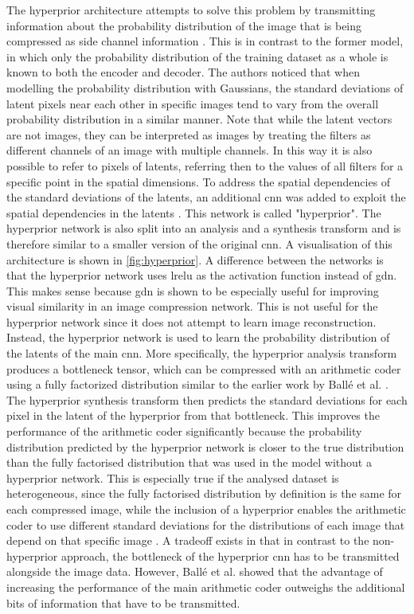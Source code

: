 The hyperprior architecture attempts to solve this problem by transmitting information about the probability distribution of the image that is being compressed as side channel information \citep{balle_variational_2018}. This is in contrast to the former model, in which only the probability distribution of the training dataset as a whole is known to both the encoder and decoder. The authors noticed that when modelling the probability distribution with Gaussians, the standard deviations of latent pixels near each other in specific images tend to vary from the overall probability distribution in a similar manner. Note that while the latent vectors are not images, they can be interpreted as images by treating the filters as different channels of an image with multiple channels. In this way it is also possible to refer to pixels of latents, referring then to the values of all filters for a specific point in the spatial dimensions. To address the spatial dependencies of the standard deviations of the latents, an additional \ac{cnn} was added to exploit the spatial dependencies in the latents \citep{balle_variational_2018}. This network is called "hyperprior". The hyperprior network is also split into an analysis and a synthesis transform and is therefore similar to a smaller version of the original \ac{cnn}. A visualisation of this architecture is shown in \autoref{fig:hyperprior}. A difference between the networks is that the hyperprior network uses \ac{lrelu} as the activation function instead of \ac{gdn}. This makes sense because \ac{gdn} is shown to be especially useful for improving visual similarity in an image compression network. This is not useful for the hyperprior network since it does not attempt to learn image reconstruction. Instead, the hyperprior network is used to learn the probability distribution of the latents of the main \ac{cnn}. More specifically, the hyperprior analysis transform produces a bottleneck tensor, which can be compressed with an arithmetic coder using a fully factorized distribution similar to the earlier work by Ballé et al. \citep{balle_end--end_2017}. The hyperprior synthesis transform then predicts the standard deviations for each pixel in the latent of the hyperprior from that bottleneck. This improves the performance of the arithmetic coder significantly because the probability distribution predicted by the hyperprior network is closer to the true distribution than the fully factorised distribution that was used in the model without a hyperprior network. This is especially true if the analysed dataset is heterogeneous, since the fully factorised distribution by definition is the same for each compressed image, while the inclusion of a hyperprior enables the arithmetic coder to use different standard deviations for the distributions of each image that depend on that specific image \citep{balle_variational_2018}. A tradeoff exists in that in contrast to the non-hyperprior approach, the bottleneck of the hyperprior \ac{cnn} has to be transmitted alongside the image data. However, Ballé et al. \citep{balle_variational_2018} showed that the advantage of increasing the performance of the main arithmetic coder outweighs the additional bits of information that have to be transmitted.

